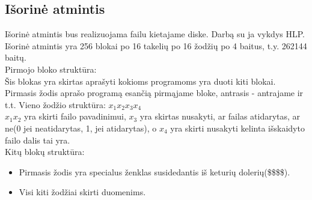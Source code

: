 	\subsection{Išorinė atmintis}
	Išorinė atmintis bus realizuojama failu kietajame diske. Darbą su ja vykdys HLP.\\
	Išorinė atmintis yra 256 blokai po 16 takelių po 16 žodžių po 4 baitus, t.y. 262144 baitų. \\
	Pirmojo bloko struktūra:\\ 
	Šis blokas yra skirtas aprašyti kokioms programoms yra duoti kiti blokai. Pirmasis žodis aprašo programą esančią pirmąjame bloke, antrasis - antrajame ir t.t. Vieno žodžio struktūra: \(x_1x_2x_3x_4\)\\
	\(x_1x_2\) yra skirti failo pavadinimui, \(x_3\) yra skirtas nusakyti, ar failas atidarytas, ar ne(0 jei neatidarytas, 1, jei atidarytas), o \(x_4\) yra skirti nusakyti kelinta išskaidyto failo dalis tai yra.\\
	Kitų blokų struktūra:
	\begin{itemize}
	\item Pirmasis žodis yra specialus ženklas susidedantis iš keturių dolerių(\$\$\$\$).%
	\item Visi kiti žodžiai skirti duomenims.
	\end{itemize}
\clearpage